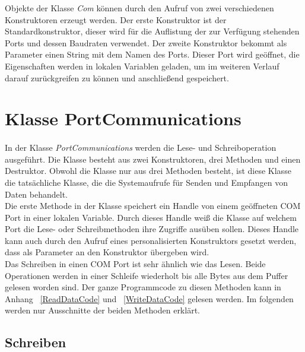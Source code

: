 Objekte der Klasse \textit{Com} können durch den Aufruf von zwei verschiedenen Konstruktoren erzeugt werden. Der erste Konstruktor ist der Standardkonstruktor, dieser wird für die Auflistung der zur Verfügung stehenden Ports und dessen Baudraten verwendet. Der zweite Konstruktor bekommt als Parameter einen String mit dem Namen des Ports. 
Dieser Port wird geöffnet, die Eigenschaften werden in lokalen Variablen geladen, um im weiteren Verlauf darauf zurückgreifen zu können und anschließend gespeichert.

\newpage


\section{Klasse PortCommunications}\label{PortCommClass}
\paragraph{}
In der Klasse \textit{PortCommunications} werden die Lese- und Schreiboperation ausgeführt. Die Klasse besteht aus zwei Konstruktoren, drei Methoden und einen Destruktor. Obwohl die Klasse nur aus drei Methoden besteht, ist diese  Klasse die tatsächliche Klasse, die die Systemaufrufe für Senden und Empfangen von Daten behandelt.\\

Die erste Methode in der Klasse speichert ein Handle von einem geöffneten COM Port in einer lokalen Variable. Durch dieses Handle weiß die Klasse auf welchem Port die Lese- oder Schreibmethoden ihre Zugriffe ausüben sollen. Dieses Handle kann auch durch den Aufruf eines personalisierten Konstruktors gesetzt werden, dass als Parameter an den Konstruktor übergeben wird.\\

Das Schreiben in einen COM Port ist sehr ähnlich wie das Lesen. Beide Operationen werden in einer Schleife wiederholt bis alle Bytes aus dem Puffer gelesen worden sind. Der ganze Programmcode zu diesen Methoden kann in Anhang ~\ref{ReadDataCode} und ~\ref{WriteDataCode} gelesen werden. Im folgenden werden nur Ausschnitte der beiden Methoden erklärt.\\

\subsection{Schreiben}\label{SchreibenPortCommClass}
